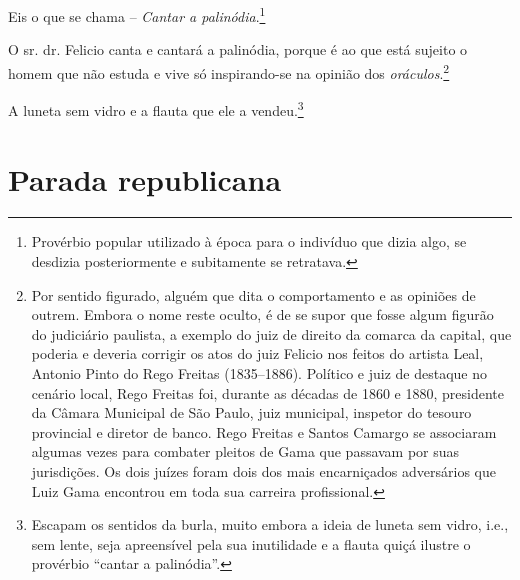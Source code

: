 {Eis o que se chama -- \emph{Cantar a palinódia}.\footnote{ Provérbio
  popular utilizado à época para o indivíduo que dizia algo, se desdizia
  posteriormente e subitamente se retratava.}

O sr. dr. Felicio canta e cantará a palinódia, porque é ao que está
sujeito o homem que não estuda e vive só inspirando-se na opinião dos
\emph{oráculos}.\footnote{ Por sentido figurado, alguém que dita o
  comportamento e as opiniões de outrem. Embora o nome reste oculto, é
  de se supor que fosse algum figurão do judiciário paulista, a exemplo
  do juiz de direito da comarca da capital, que poderia e deveria
  corrigir os atos do juiz Felicio nos feitos do artista Leal, Antonio
  Pinto do Rego Freitas (1835--1886). Político e juiz de destaque no
  cenário local, Rego Freitas foi, durante as décadas de 1860 e 1880,
  presidente da Câmara Municipal de São Paulo, juiz municipal, inspetor
  do tesouro provincial e diretor de banco. Rego Freitas e Santos
  Camargo se associaram algumas vezes para combater pleitos de Gama que
  passavam por suas jurisdições. Os dois juízes foram dois dos mais
  encarniçados adversários que Luiz Gama encontrou em toda sua carreira
  profissional.}

A luneta sem vidro e a flauta que ele a vendeu.\footnote{ Escapam os
  sentidos da burla, muito embora a ideia de luneta sem vidro, i.e., sem
  lente, seja apreensível pela sua inutilidade e a flauta quiçá ilustre
  o provérbio ``cantar a palinódia''.}

\part{Parada republicana}

}
